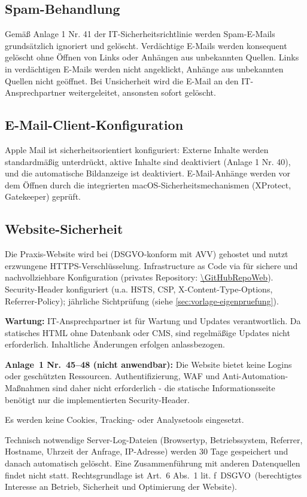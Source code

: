 \subsection{Spam-Behandlung}

Gemäß Anlage 1 Nr. 41 der IT-Sicherheitsrichtlinie werden Spam-E-Mails grundsätzlich
ignoriert und gelöscht. Verdächtige E-Mails werden konsequent gelöscht ohne Öffnen von
Links oder Anhängen aus unbekannten Quellen. Links in verdächtigen E-Mails werden nicht
angeklickt, Anhänge aus unbekannten Quellen nicht geöffnet. Bei Unsicherheit wird die
E-Mail an den IT-Ansprechpartner weitergeleitet, ansonsten sofort gelöscht.

\subsection{E-Mail-Client-Konfiguration}

Apple Mail ist sicherheitsorientiert konfiguriert: Externe Inhalte werden standardmäßig
unterdrückt, aktive Inhalte sind deaktiviert (Anlage 1 Nr. 40), und die automatische
Bildanzeige ist deaktiviert. E-Mail-Anhänge werden vor dem Öffnen durch die integrierten
macOS-Sicherheitsmechanismen (XProtect, Gatekeeper) geprüft.

\subsection{Website-Sicherheit}
\label{sec:website-sicherheit}

Die Praxis-Website wird bei \HostingAnbieter{} (DSGVO-konform mit AVV) gehostet und nutzt erzwungene
HTTPS-Verschlüsselung. Infrastructure as Code via \IaCTool{} für sichere und nachvollziehbare
Konfiguration (privates Repository: \url{\GitHubRepoWeb}).
Security-Header konfiguriert (u.a. HSTS, CSP, X-Content-Type-Options, Referrer-Policy);
jährliche Sichtprüfung (siehe \cref{sec:vorlage-eigenpruefung}).

\textbf{Wartung:} IT-Ansprechpartner ist für Wartung und Updates verantwortlich.
Da statisches HTML ohne Datenbank oder CMS, sind regelmäßige Updates nicht erforderlich.
Inhaltliche Änderungen erfolgen anlassbezogen.

\textbf{Anlage~1 Nr.~45–48 (nicht anwendbar):} Die Website bietet keine Logins oder
geschützten Ressourcen. Authentifizierung, WAF und Anti-Automation-Maßnahmen sind
daher nicht erforderlich - die statische Informationsseite benötigt nur die
implementierten Security-Header.

Es werden keine Cookies, Tracking- oder Analysetools eingesetzt.

Technisch notwendige Server-Log-Dateien (Browsertyp, Betriebssystem, Referrer, Hostname,
Uhrzeit der Anfrage, IP-Adresse) werden 30 Tage gespeichert und danach automatisch gelöscht.
Eine Zusammenführung mit anderen Datenquellen findet nicht statt. Rechtsgrundlage ist
Art.\ 6 Abs.\ 1 lit. f\ DSGVO\ (berechtigtes Interesse an Betrieb, Sicherheit und
Optimierung der Website).
